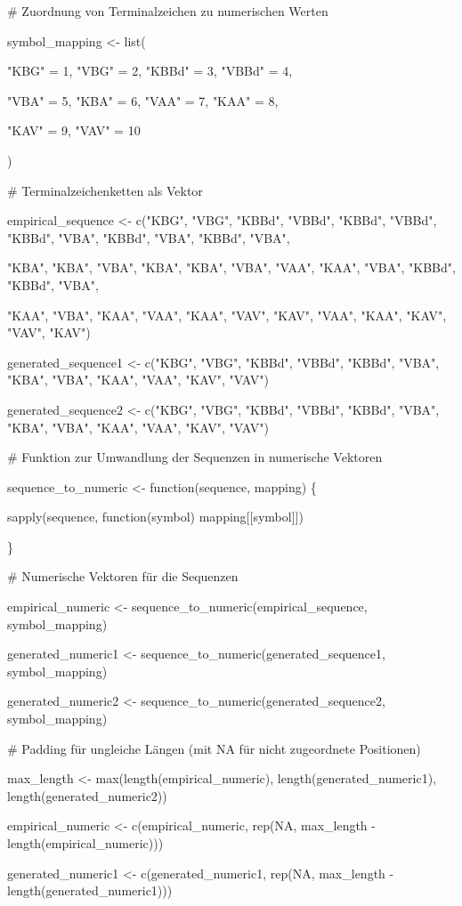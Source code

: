 \documentclass[
]{article}
\begin{document}
\# Zuordnung von Terminalzeichen zu numerischen Werten

symbol\_mapping \textless- list(

"KBG" = 1, "VBG" = 2, "KBBd" = 3, "VBBd" = 4,

"VBA" = 5, "KBA" = 6, "VAA" = 7, "KAA" = 8,

"KAV" = 9, "VAV" = 10

)

\# Terminalzeichenketten als Vektor

empirical\_sequence \textless- c("KBG", "VBG", "KBBd", "VBBd", "KBBd",
"VBBd", "KBBd", "VBA", "KBBd", "VBA", "KBBd", "VBA",

"KBA", "KBA", "VBA", "KBA", "KBA", "VBA", "VAA", "KAA", "VBA", "KBBd",
"KBBd", "VBA",

"KAA", "VBA", "KAA", "VAA", "KAA", "VAV", "KAV", "VAA", "KAA", "KAV",
"VAV", "KAV")

generated\_sequence1 \textless- c("KBG", "VBG", "KBBd", "VBBd", "KBBd",
"VBA", "KBA", "VBA", "KAA", "VAA", "KAV", "VAV")

generated\_sequence2 \textless- c("KBG", "VBG", "KBBd", "VBBd", "KBBd",
"VBA", "KBA", "VBA", "KAA", "VAA", "KAV", "VAV")

\# Funktion zur Umwandlung der Sequenzen in numerische Vektoren

sequence\_to\_numeric \textless- function(sequence, mapping) \{

sapply(sequence, function(symbol) mapping{[}{[}symbol{]}{]})

\}

\# Numerische Vektoren für die Sequenzen

empirical\_numeric \textless- sequence\_to\_numeric(empirical\_sequence,
symbol\_mapping)

generated\_numeric1 \textless-
sequence\_to\_numeric(generated\_sequence1, symbol\_mapping)

generated\_numeric2 \textless-
sequence\_to\_numeric(generated\_sequence2, symbol\_mapping)

\# Padding für ungleiche Längen (mit NA für nicht zugeordnete
Positionen)

max\_length \textless- max(length(empirical\_numeric),
length(generated\_numeric1), length(generated\_numeric2))

empirical\_numeric \textless- c(empirical\_numeric, rep(NA, max\_length
- length(empirical\_numeric)))

generated\_numeric1 \textless- c(generated\_numeric1, rep(NA,
max\_length - length(generated\_numeric1)))
\end{document}
